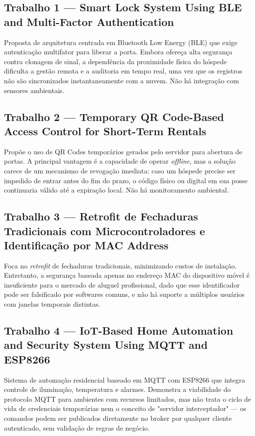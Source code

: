 \documentclass[12pt,a4paper]{article}
\begin{document}
\subsection*{Trabalho 1 — Smart Lock System Using BLE and Multi-Factor Authentication}

Proposta de arquitetura centrada em Bluetooth Low Energy (BLE) que exige autenticação
multifator para liberar a porta. Embora ofereça alta segurança contra clonagem de
sinal, a dependência da proximidade física do hóspede dificulta a gestão remota e a
auditoria em tempo real, uma vez que os registros não são sincronizados
instantaneamente com a nuvem. Não há integração com sensores ambientais.

\subsection*{Trabalho 2 — Temporary QR Code-Based Access Control for Short-Term Rentals}

Propõe o uso de QR Codes temporários gerados pelo servidor para abertura de portas.
A principal vantagem é a capacidade de operar \emph{offline}, mas a solução carece de
um mecanismo de revogação imediata: caso um hóspede precise ser impedido de entrar
antes do fim do prazo, o código físico ou digital em sua posse continuaria válido até
a expiração local. Não há monitoramento ambiental.

\subsection*{Trabalho 3 — Retrofit de Fechaduras Tradicionais com Microcontroladores e
Identificação por MAC Address}

Foca no \emph{retrofit} de fechaduras tradicionais, minimizando custos de instalação.
Entretanto, a segurança baseada apenas no endereço MAC do dispositivo móvel é
insuficiente para o mercado de aluguel profissional, dado que esse identificador pode
ser falsificado por softwares comuns, e não há suporte a múltiplos usuários com janelas
temporais distintas.

\subsection*{Trabalho 4 — IoT-Based Home Automation and Security System Using MQTT and ESP8266}

Sistema de automação residencial baseado em MQTT com ESP8266 que integra controle
de iluminação, temperatura e alarmes. Demonstra a viabilidade do protocolo MQTT
para ambientes com recursos limitados, mas não trata o ciclo de vida de credenciais
temporárias nem o conceito de "servidor interceptador" — os comandos podem ser
publicados diretamente no broker por qualquer cliente autenticado, sem validação de
regras de negócio.
\end{document}
